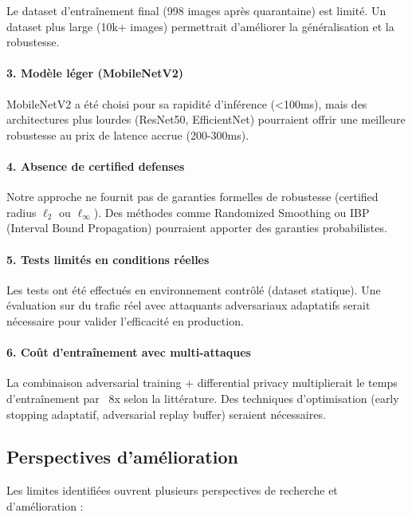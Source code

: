 Le dataset d'entraînement final (998 images après quarantaine) est limité. Un dataset plus large (10k+ images) permettrait d'améliorer la généralisation et la robustesse.

\paragraph{3. Modèle léger (MobileNetV2)}

MobileNetV2 a été choisi pour sa rapidité d'inférence (<100ms), mais des architectures plus lourdes (ResNet50, EfficientNet) pourraient offrir une meilleure robustesse au prix de latence accrue (200-300ms).

\paragraph{4. Absence de certified defenses}

Notre approche ne fournit pas de garanties formelles de robustesse (certified radius $\ell_2$ ou $\ell_\infty$). Des méthodes comme Randomized Smoothing ou IBP (Interval Bound Propagation) pourraient apporter des garanties probabilistes.

\paragraph{5. Tests limités en conditions réelles}

Les tests ont été effectués en environnement contrôlé (dataset statique). Une évaluation sur du trafic réel avec attaquants adversariaux adaptatifs serait nécessaire pour valider l'efficacité en production.

\paragraph{6. Coût d'entraînement avec multi-attaques}

La combinaison adversarial training + differential privacy multiplierait le temps d'entraînement par ~8x selon la littérature. Des techniques d'optimisation (early stopping adaptatif, adversarial replay buffer) seraient nécessaires.

\subsection{Perspectives d'amélioration}

Les limites identifiées ouvrent plusieurs perspectives de recherche et d'amélioration :

